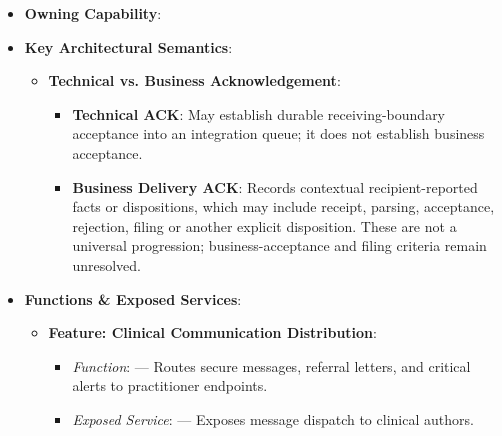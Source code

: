 \begin{itemize}

\item 
\textbf{Owning Capability}: \texttt{}



\item 
\textbf{Key Architectural Semantics}:


\begin{itemize}

\item 
\textbf{Technical vs. Business Acknowledgement}:


\begin{itemize}

\item 
\textbf{Technical ACK}: May establish durable receiving-boundary acceptance into an integration queue; it does not establish business acceptance.



\item 
\textbf{Business Delivery ACK}: Records contextual recipient-reported facts or dispositions, which may include receipt, parsing, acceptance, rejection, filing or another explicit disposition. These are not a universal progression; business-acceptance and filing criteria remain unresolved.



\end{itemize}


\end{itemize}


\item 
\textbf{Functions \& Exposed Services}:


\begin{itemize}

\item 
\textbf{Feature: Clinical Communication Distribution}:


\begin{itemize}

\item 
\emph{Function}: \texttt{} — Routes secure messages, referral letters, and critical alerts to practitioner endpoints.



\item 
\emph{Exposed Service}: \texttt{} — Exposes message dispatch to clinical authors.




\end{itemize}
\end{itemize}
\end{itemize}
